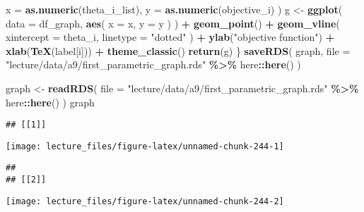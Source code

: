 \documentclass[
]{book}
\newenvironment{Shaded}{\begin{snugshade}}{\end{snugshade}}
\newcommand{\AttributeTok}[1]{\textcolor[rgb]{0.13,0.29,0.53}{#1}}
\newcommand{\FunctionTok}[1]{\textcolor[rgb]{0.13,0.29,0.53}{\textbf{#1}}}
\newcommand{\NormalTok}[1]{#1}
\newcommand{\OtherTok}[1]{\textcolor[rgb]{0.56,0.35,0.01}{#1}}
\newcommand{\SpecialCharTok}[1]{\textcolor[rgb]{0.81,0.36,0.00}{\textbf{#1}}}
\newcommand{\StringTok}[1]{\textcolor[rgb]{0.31,0.60,0.02}{#1}}
\begin{document}
\begin{Shaded}
\begin{Highlighting}[]
      \AttributeTok{x =} \FunctionTok{as.numeric}\NormalTok{(theta\_i\_list), }
      \AttributeTok{y =} \FunctionTok{as.numeric}\NormalTok{(objective\_i)}
\NormalTok{      )}
\NormalTok{  g }\OtherTok{\textless{}{-}}
    \FunctionTok{ggplot}\NormalTok{(}
      \AttributeTok{data =}\NormalTok{ df\_graph,}
      \FunctionTok{aes}\NormalTok{(}
        \AttributeTok{x =}\NormalTok{ x,}
        \AttributeTok{y =}\NormalTok{ y}
\NormalTok{        )}
\NormalTok{      ) }\SpecialCharTok{+}
    \FunctionTok{geom\_point}\NormalTok{() }\SpecialCharTok{+}
    \FunctionTok{geom\_vline}\NormalTok{(}
      \AttributeTok{xintercept =}\NormalTok{ theta\_i, }
      \AttributeTok{linetype =} \StringTok{"dotted"}
\NormalTok{      ) }\SpecialCharTok{+}
    \FunctionTok{ylab}\NormalTok{(}\StringTok{"objective function"}\NormalTok{) }\SpecialCharTok{+} 
    \FunctionTok{xlab}\NormalTok{(}\FunctionTok{TeX}\NormalTok{(label[i])) }\SpecialCharTok{+} 
    \FunctionTok{theme\_classic}\NormalTok{()}
  \FunctionTok{return}\NormalTok{(g)}
\NormalTok{\}}
\FunctionTok{saveRDS}\NormalTok{(}
\NormalTok{  graph,}
  \AttributeTok{file =} \StringTok{"lecture/data/a9/first\_parametric\_graph.rds"} \SpecialCharTok{\%\textgreater{}\%}\NormalTok{ here}\SpecialCharTok{::}\FunctionTok{here}\NormalTok{()}
\NormalTok{)}
\end{Highlighting}
\end{Shaded}

\begin{Shaded}
\begin{Highlighting}[]
\NormalTok{graph }\OtherTok{\textless{}{-}} 
  \FunctionTok{readRDS}\NormalTok{(}
    \AttributeTok{file =} \StringTok{"lecture/data/a9/first\_parametric\_graph.rds"} \SpecialCharTok{\%\textgreater{}\%}\NormalTok{ here}\SpecialCharTok{::}\FunctionTok{here}\NormalTok{()}
\NormalTok{  )}
\NormalTok{graph}
\end{Highlighting}
\end{Shaded}

\begin{verbatim}
## [[1]]
\end{verbatim}

\begin{center}\texttt{[image: lecture\_files/figure-latex/unnamed-chunk-244-1]} \end{center}

\begin{verbatim}
## 
## [[2]]
\end{verbatim}

\begin{center}\texttt{[image: lecture\_files/figure-latex/unnamed-chunk-244-2]} \end{center}
\end{document}
